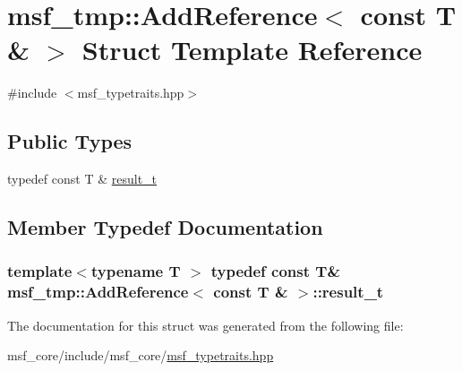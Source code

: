 \hypertarget{structmsf__tmp_1_1AddReference_3_01const_01T_01_6_01_4}{\section{msf\-\_\-tmp\-:\-:Add\-Reference$<$ const T \& $>$ Struct Template Reference}
\label{structmsf__tmp_1_1AddReference_3_01const_01T_01_6_01_4}
}


{\ttfamily \#include $<$msf\-\_\-typetraits.\-hpp$>$}

\subsection*{Public Types}
\begin{DoxyCompactItemize}
\item 
typedef const T \& \hyperlink{structmsf__tmp_1_1AddReference_3_01const_01T_01_6_01_4_ae28a2491a76190e92e39dab2ad4e88f1}{result\-\_\-t}
\end{DoxyCompactItemize}


\subsection{Member Typedef Documentation}
\hypertarget{structmsf__tmp_1_1AddReference_3_01const_01T_01_6_01_4_ae28a2491a76190e92e39dab2ad4e88f1}{
\subsubsection[{result\-\_\-t}]{\setlength{\rightskip}{0pt plus 5cm}template$<$typename T $>$ typedef const T\& {\bf msf\-\_\-tmp\-::\-Add\-Reference}$<$ const T \& $>$\-::{\bf result\-\_\-t}}}\label{structmsf__tmp_1_1AddReference_3_01const_01T_01_6_01_4_ae28a2491a76190e92e39dab2ad4e88f1}


The documentation for this struct was generated from the following file\-:\begin{DoxyCompactItemize}
\item 
msf\-\_\-core/include/msf\-\_\-core/\hyperlink{msf__typetraits_8hpp}{msf\-\_\-typetraits.\-hpp}\end{DoxyCompactItemize}
